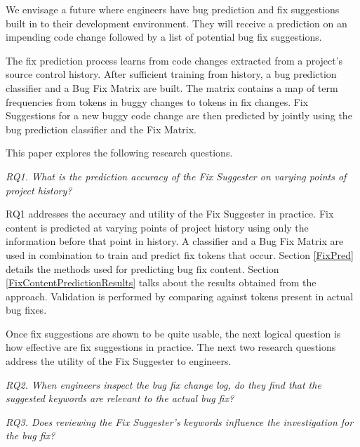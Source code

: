 \documentclass[conference]{IEEEtran}
\begin{document}
We envisage a future where engineers have bug prediction and fix suggestions built in to their development environment.
They will receive a prediction on an impending code change followed by a list of potential
bug fix suggestions.

The fix prediction process learns from code changes extracted from a project's source control history. After sufficient
training from history, a bug prediction classifier and a Bug Fix Matrix are built. The matrix contains a map of term frequencies from tokens in buggy changes to tokens in fix changes. Fix Suggestions for a new buggy code change are then predicted by jointly using the bug prediction classifier and the Fix Matrix.

This paper explores the following research questions.

\textit{RQ1. What is the prediction accuracy of the Fix Suggester on varying points of project history?}

RQ1 addresses the accuracy and utility of the Fix Suggester in practice. Fix content is predicted at varying points of project history using
only the information before that point in history. A classifier
and a Bug Fix Matrix are used in combination to train and predict fix tokens that occur. Section
\ref{FixPred} details the methods used for predicting
bug fix content. Section \ref{FixContentPredictionResults} talks
about the results obtained from the approach. Validation is performed by comparing against tokens present in actual bug fixes.

Once fix suggestions are shown to be quite usable, the next logical question is how effective are fix suggestions in practice.
The next two research questions address the utility of the Fix Suggester to engineers.

\textit{RQ2. When engineers inspect the bug fix change log, do they find that the suggested keywords are relevant to the actual bug fix?}

\textit{RQ3. Does reviewing the Fix Suggester's keywords influence the investigation for the bug fix?}
\end{document}
